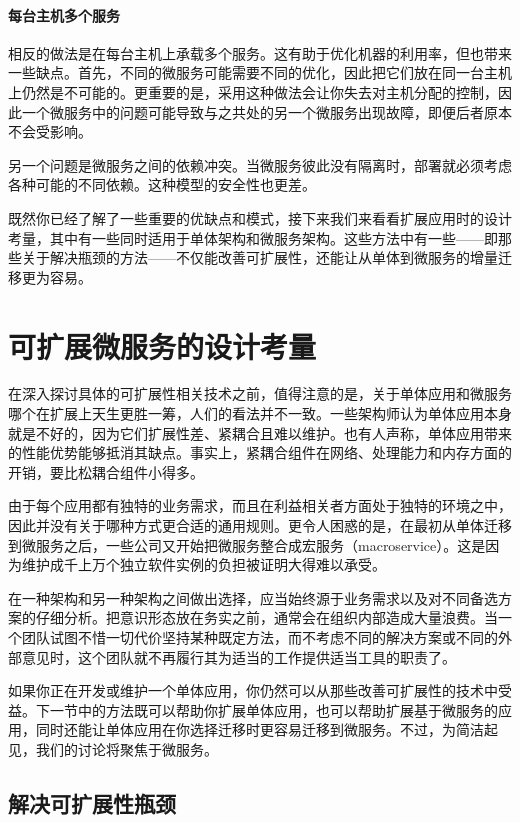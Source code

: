 \paragraph{每台主机多个服务}

\label{idx:1416}
相反的做法是在每台主机上承载多个服务。这有助于优化机器的利用率，但也带来一些缺点。首先，不同的微服务可能需要不同的优化，因此把它们放在同一台主机上仍然是不可能的。更重要的是，采用这种做法会让你失去对主机分配的控制，因此一个微服务中的问题可能导致与之共处的另一个微服务出现故障，即便后者原本不会受影响。

另一个问题是微服务之间的依赖冲突。当微服务彼此没有隔离时，部署就必须考虑各种可能的不同依赖。这种模型的安全性也更差。

\label{idx:1417}
\label{idx:1418}
既然你已经了解了一些重要的优缺点和模式，接下来我们来看看扩展应用时的设计考量，其中有一些同时适用于单体架构和微服务架构。这些方法中有一些——即那些关于解决瓶颈的方法——不仅能改善可扩展性，还能让从单体到微服务的增量迁移更为容易。

\section{可扩展微服务的设计考量}

\label{idx:1419}
\label{idx:1420}
在深入探讨具体的可扩展性相关技术之前，值得注意的是，关于单体应用和微服务哪个在扩展上天生更胜一筹，人们的看法并不一致。一些架构师认为单体应用本身就是不好的，因为它们扩展性差、紧耦合且难以维护。也有人声称，单体应用带来的性能优势能够抵消其缺点。事实上，紧耦合组件在网络、处理能力和内存方面的开销，要比松耦合组件小得多。

由于每个应用都有独特的业务需求，而且在利益相关者方面处于独特的环境之中，因此并没有关于哪种方式更合适的通用规则。更令人困惑的是，在最初从单体迁移到微服务之后，一些公司又开始把微服务整合成宏服务（macroservice）。这是因为维护成千上万个独立软件实例的负担被证明大得难以承受。

在一种架构和另一种架构之间做出选择，应当始终源于业务需求以及对不同备选方案的仔细分析。把意识形态放在务实之前，通常会在组织内部造成大量浪费。当一个团队试图不惜一切代价坚持某种既定方法，而不考虑不同的解决方案或不同的外部意见时，这个团队就不再履行其为适当的工作提供适当工具的职责了。

如果你正在开发或维护一个单体应用，你仍然可以从那些改善可扩展性的技术中受益。下一节中的方法既可以帮助你扩展单体应用，也可以帮助扩展基于微服务的应用，同时还能让单体应用在你选择迁移时更容易迁移到微服务。不过，为简洁起见，我们的讨论将聚焦于微服务。

\subsection{解决可扩展性瓶颈}

